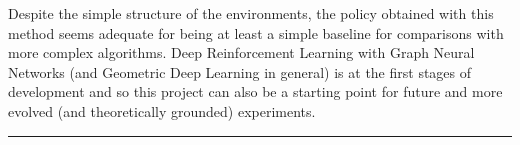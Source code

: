 \documentclass[a4paper]{article}
\begin{document}
Despite the simple structure of the environments, the policy obtained with this method seems adequate for being at least a simple baseline for comparisons with more complex algorithms. Deep Reinforcement Learning with Graph Neural Networks (and Geometric Deep Learning in general) is at the first stages of development and so this project can also be a starting point for future and more evolved (and theoretically grounded) experiments.

\newpage
\noindent\rule[0.25\baselineskip]{\textwidth}{1pt}

{}

\end{document}
